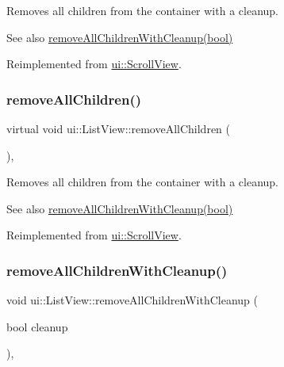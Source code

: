 Removes all children from the container with a cleanup.

\begin{DoxySeeAlso}{See also}
{\ttfamily \hyperlink{classui_1_1ListView_a01691c095058bc86f372e6439b15b151}{remove\+All\+Children\+With\+Cleanup(bool)}} 
\end{DoxySeeAlso}


Reimplemented from \hyperlink{classui_1_1ScrollView_aaef2d3ce7b1b7d485af4a3657bea17e5}{ui\+::\+Scroll\+View}.

\mbox{\label{classui_1_1ListView_acfa88e95692c1e9713697fbd2754379b}} 
\subsubsection{\texorpdfstring{remove\+All\+Children()}{removeAllChildren()}\hspace{0.1cm}{\footnotesize\ttfamily [2/2]}}
{\footnotesize\ttfamily virtual void ui\+::\+List\+View\+::remove\+All\+Children (\begin{DoxyParamCaption}{ }\end{DoxyParamCaption})\hspace{0.3cm}{\ttfamily [override]}, {\ttfamily [virtual]}}

Removes all children from the container with a cleanup.

\begin{DoxySeeAlso}{See also}
{\ttfamily \hyperlink{classui_1_1ListView_a01691c095058bc86f372e6439b15b151}{remove\+All\+Children\+With\+Cleanup(bool)}} 
\end{DoxySeeAlso}


Reimplemented from \hyperlink{classui_1_1ScrollView_aaef2d3ce7b1b7d485af4a3657bea17e5}{ui\+::\+Scroll\+View}.

\mbox{\label{classui_1_1ListView_a01691c095058bc86f372e6439b15b151}} 
\subsubsection{\texorpdfstring{remove\+All\+Children\+With\+Cleanup()}{removeAllChildrenWithCleanup()}\hspace{0.1cm}{\footnotesize\ttfamily [1/2]}}
{\footnotesize\ttfamily void ui\+::\+List\+View\+::remove\+All\+Children\+With\+Cleanup (\begin{DoxyParamCaption}\item[{bool}]{cleanup }\end{DoxyParamCaption})\hspace{0.3cm}{\ttfamily [override]}, {\ttfamily [virtual]}}


